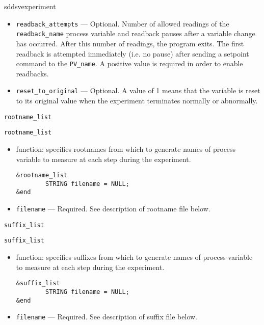 \begin{sddsprog}{sddsvexperiment}
\begin{itemize}
\begin{itemize}
    \item {\verb+readback_attempts+} --- Optional. Number of allowed
       readings of the {\verb+readback_name+} process variable and
       readback pauses after a variable change has occurred.  After
       this number of readings, the program exits.  The first readback
       is attempted immediately (i.e. no pause) after sending a
       setpoint command to the {\verb+PV_name+}.  A positive value is
       required in order to enable readbacks.

    \item {\verb+reset_to_original+} --- Optional. A value of 1 means
       that the variable is reset to its original value when the
       experiment terminates normally or abnormally.
  \end{itemize}


\begin{latexonly}
\newpage\begin{center}{\Large \verb+rootname_list+}\end{center}
\end{latexonly}
\begin{htmlonly}
  \item {\Large \verb+rootname_list+}
\end{htmlonly}

  \begin{itemize}
    \item function: specifies rootnames from which to generate names of process variable to measure at each step during the experiment.
\begin{verbatim}
&rootname_list
        STRING filename = NULL;
&end
\end{verbatim}
    \item {\verb+filename+} --- Required. See description of rootname file below.
  \end{itemize}

\begin{latexonly}
\begin{center}{\Large \verb+suffix_list+}\end{center}
\end{latexonly}
\begin{htmlonly}
  \item {\Large \verb+suffix_list+}
\end{htmlonly}
  \begin{itemize}
    \item function: specifies suffixes from which to generate names of process variable to measure at each step during the experiment.
\begin{verbatim}
&suffix_list
        STRING filename = NULL;
&end
\end{verbatim}
    \item {\verb+filename+} --- Required. See description of suffix file below.
  \end{itemize}


\end{itemize}
\end{sddsprog}
